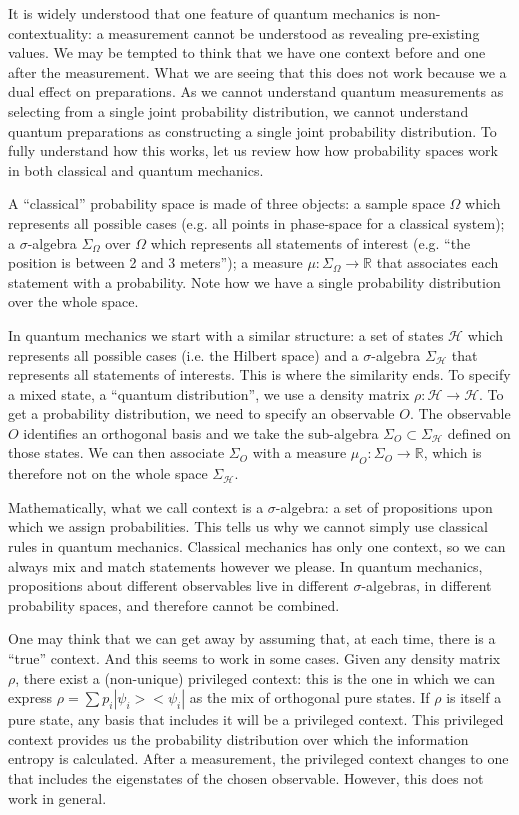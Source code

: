 \documentclass[10pt,twocolumn, nofootinbib]{revtex4-2}
\begin{document}
It is widely understood that one feature of quantum mechanics is non-contextuality: a measurement cannot be understood as revealing pre-existing values. We may be tempted to think that we have one context before and one after the measurement. What we are seeing that this does not work because we a dual effect on preparations. As we cannot understand quantum measurements as selecting from a single joint probability distribution, we cannot understand quantum preparations as constructing a single joint probability distribution. To fully understand how this works, let us review how how probability spaces work in both classical and quantum mechanics.

A ``classical'' probability space is made of three objects: a sample space $\Omega$ which represents all possible cases (e.g. all points in phase-space for a classical system); a $\sigma$-algebra $\Sigma_\Omega$ over $\Omega$ which represents all statements of interest (e.g. ``the position is between 2 and 3 meters''); a measure $\mu : \Sigma_\Omega \to \mathbb{R}$ that associates each statement with a probability. Note how we have a single probability distribution over the whole space.

In quantum mechanics we start with a similar structure: a set of states $\mathcal{H}$ which represents all possible cases (i.e. the Hilbert space) and a $\sigma$-algebra $\Sigma_{\mathcal{H}}$ that represents all statements of interests. This is where the similarity ends. To specify a mixed state, a ``quantum distribution'', we use a density matrix $\rho : \mathcal{H} \to \mathcal{H}$. To get a probability distribution, we need to specify an observable $O$. The observable $O$ identifies an orthogonal basis and we take the sub-algebra $\Sigma_O \subset \Sigma_{\mathcal{H}}$ defined on those states. We can then associate $\Sigma_O$ with a measure $\mu_O : \Sigma_O \to \mathbb{R}$, which is therefore not on the whole space $\Sigma_{\mathcal{H}}$.

Mathematically, what we call context is a $\sigma$-algebra: a set of propositions upon which we assign probabilities. This tells us why we cannot simply use classical rules in quantum mechanics. Classical mechanics has only one context, so we can always mix and match statements however we please. In quantum mechanics, propositions about different observables live in different $\sigma$-algebras, in different probability spaces, and therefore cannot be combined.

One may think that we can get away by assuming that, at each time, there is a ``true'' context. And this seems to work in some cases. Given any density matrix $\rho$, there exist a (non-unique) privileged context: this is the one in which we can express $\rho = \sum p_i |\psi_i > < \psi_i|$ as the mix of orthogonal pure states. If $\rho$ is itself a pure state, any basis that includes it will be a privileged context. This privileged context provides us the probability distribution over which the information entropy is calculated. After a measurement, the privileged context changes to one that includes the eigenstates of the chosen observable. However, this does not work in general.
\end{document}
